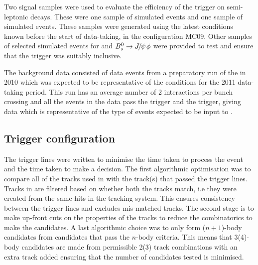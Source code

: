 Two signal samples were used to evaluate the efficiency of the trigger on semi-leptonic \B decays. 
These were one sample of \BtoDmunu simulated events and one sample of \BtoDsmunu simulated events.
These samples were generated using the latest conditions known before the start of data-taking, in the configuration MC09.
Other samples of selected simulated events for \BsToPhimm and $\Bs\to\jpsi\phi$ were provided to test and ensure that the trigger
was suitably inclusive.

The background data consisted of data events from a preparatory run of the \lhc in 2010 which was expected to be representative of the 
conditions for the 2011 data-taking period. 
This run has an average number of 2 interactions per bunch crossing and all the events in the data
 pass the \lzero trigger and the \hltone trigger, giving data which is representative of the type of events expected to be input to \hlttwo.

\subsection{Trigger configuration}
\label{sec:trigdev:config}

The trigger lines were written to minimise the time taken to process the event and the time taken to make a decision.
The first algorithmic optimisation was to compare all of the tracks used in \hlttwo with the track(s) that passed the \hltone trigger lines.
Tracks in \hlttwo are filtered based on whether both the tracks match, i.e they were created from the same hits in the tracking system.
This ensures consistency between the trigger lines and excludes mis-matched tracks.
The second stage is to make up-front cuts on the properties of the tracks to reduce the combinatorics to make the candidates.
A last algorithmic choice was to only form ($n+1$)-body candidates from candidates that pass the $n$-body criteria.
This means that 3(4)-body candidates are made from permissible 2(3) track combinations with an extra track added ensuring
that the number of candidates tested is minimised.

